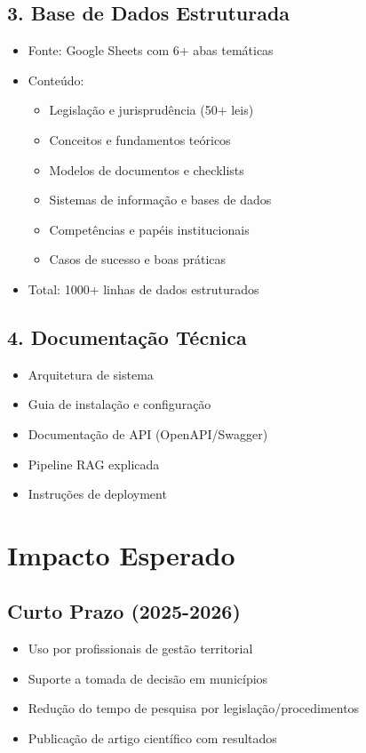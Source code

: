 \documentclass[12pt,a4paper]{report}
\begin{document}
\subsection{3. Base de Dados Estruturada}

\begin{itemize}
  \item Fonte: Google Sheets com 6+ abas temáticas
  \item Conteúdo:
  \begin{itemize}
    \item Legislação e jurisprudência (50+ leis)
    \item Conceitos e fundamentos teóricos
    \item Modelos de documentos e checklists
    \item Sistemas de informação e bases de dados
    \item Competências e papéis institucionais
    \item Casos de sucesso e boas práticas
  \end{itemize}
  \item Total: 1000+ linhas de dados estruturados
\end{itemize}

\subsection{4. Documentação Técnica}

\begin{itemize}
  \item Arquitetura de sistema
  \item Guia de instalação e configuração
  \item Documentação de API (OpenAPI/Swagger)
  \item Pipeline RAG explicada
  \item Instruções de deployment
\end{itemize}

\section{Impacto Esperado}

\subsection{Curto Prazo (2025-2026)}

\begin{itemize}
  \item Uso por profissionais de gestão territorial
  \item Suporte a tomada de decisão em municípios
  \item Redução do tempo de pesquisa por legislação/procedimentos
  \item Publicação de artigo científico com resultados
\end{itemize}
\end{document}
